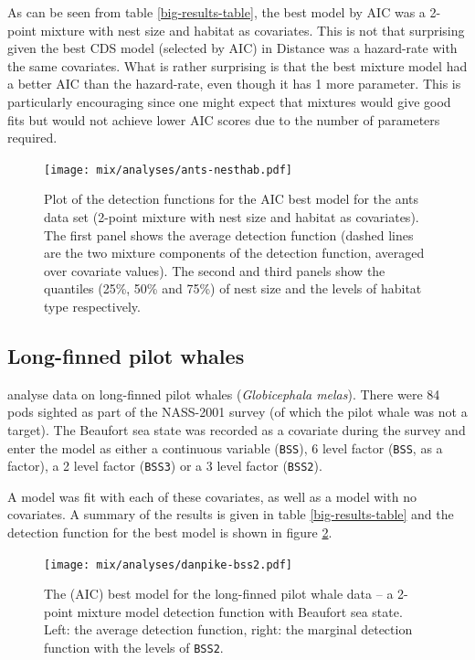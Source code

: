 As can be seen from table \ref{big-results-table}, the best model by AIC was a 2-point mixture with nest size and habitat as covariates. This is not that surprising given the best CDS model (selected by AIC) in Distance was a hazard-rate with the same covariates. What is rather surprising is that the best mixture model had a better AIC than the hazard-rate, even though it has 1 more parameter. This is particularly encouraging since one might expect that mixtures would give good fits but would not achieve lower AIC scores due to the number of parameters required.

\begin{figure}
\centering
\texttt{[image: mix/analyses/ants-nesthab.pdf]}
\caption{Plot of the detection functions for the AIC best model for the ants data set (2-point mixture with nest size and habitat as covariates). The first panel shows the average detection function (dashed lines are the two mixture components of the detection function, averaged over covariate values). The second and third panels show the quantiles (25\%, 50\% and 75\%) of nest size and the levels of habitat type respectively.}
\label{ants-nesthab}
\end{figure}

\subsection{Long-finned pilot whales}
\label{mix-pilotwhales}

 analyse data on long-finned pilot whales (\textit{Globicephala melas}). There were 84 pods sighted as part of the NASS-2001 survey (of which the pilot whale was not a target). The Beaufort sea state was recorded as a covariate during the survey and enter the model as either a continuous variable (\texttt{BSS}), 6 level factor (\texttt{BSS}, as a factor), a 2 level factor (\texttt{BSS3}) or a 3 level factor (\texttt{BSS2}).

A model was fit with each of these covariates, as well as a model with no covariates. A summary of the results is given in table \ref{big-results-table} and the detection function for the best model is shown in figure \ref{danpike-detfct}.

\begin{figure}
\centering
\texttt{[image: mix/analyses/danpike-bss2.pdf]}
\caption{The (AIC) best model for the long-finned pilot whale data -- a 2-point mixture model detection function with Beaufort sea state. Left: the average detection function, right: the marginal detection function with the levels of \texttt{BSS2}.}
\label{danpike-detfct}
\end{figure}

